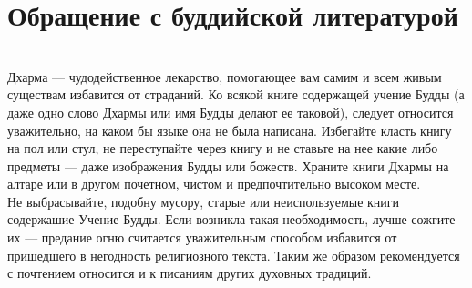\section*{Обращение с буддийской литературой}
\\
Дхарма — чудодейственное лекарство, помогающее вам
самим и всем живым существам избавится от страданий.
Ко всякой книге содержащей учение Будды (а даже одно
слово Дхармы или имя Будды делают ее таковой),  следует
относится уважи\-тельно, на каком бы языке она не была написана.
Избегайте класть книгу на пол или стул, не переступайте
через книгу и не ставьте на нее какие либо
предметы — даже изображения Будды или божеств.
Храните книги Дхармы на алтаре или в другом почетном,
чистом и предпочтительно высоком месте.\\
Не выбрасывайте, подобну мусору, старые или неисполь\-зуе\-мые
книги содержашие Учение Будды. Если возникла такая необходимость,
лучше сожгите их — предание огню считается уважительным
способом избавится от пришедшего в негод\-ность 
религиозного текста. Таким же образом рекомендуется
с почтением относится и к писаниям других духовных традиций.
